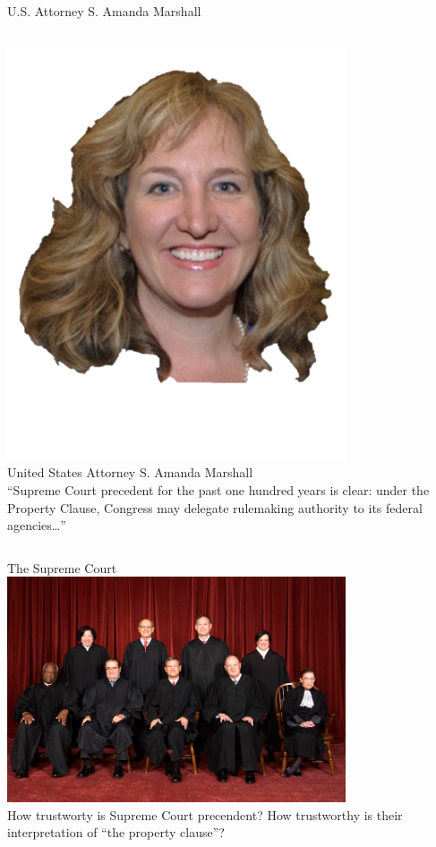 \begin{frame}{U.S. Attorney S. Amanda Marshall}
    \begin{columns}[onlytextwidth]
            \centering
            \includegraphics[width=0.75\textwidth]{img/amanda-marshall.png} \\
            United States Attorney S. Amanda Marshall \\

            ``Supreme Court precedent for the past one hundred years is clear: under the Property Clause, Congress may delegate rulemaking authority to its federal agencies\ldots''
    \end{columns}
\end{frame}

\begin{frame}{The Supreme Court}
    \centering
    \includegraphics[width=0.75\textwidth]{img/supreme.png} \\
    How trustworty is Supreme Court precendent? How trustworthy is their interpretation of ``the property clause''?
\end{frame}

